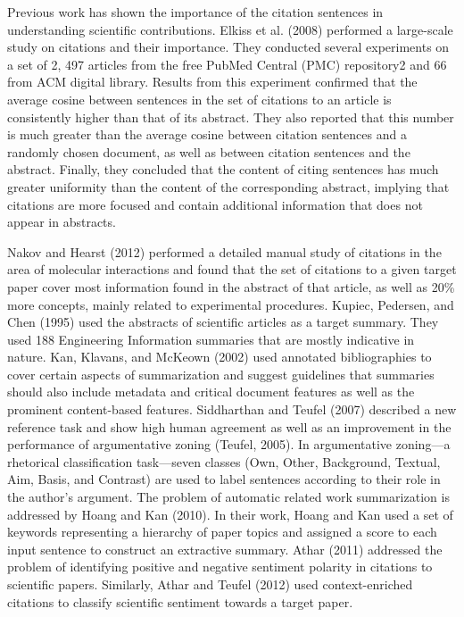 Previous work has shown the importance of the citation sentences in understanding
scientific contributions. Elkiss et al. (2008) performed a large-scale study on citations and
their importance. They conducted several experiments on a set of 2, 497 articles from the
free PubMed Central (PMC) repository2 and 66 from ACM digital library. Results from this
experiment confirmed that the average cosine between sentences in the set of citations to an
article is consistently higher than that of its abstract. They also reported that this number
is much greater than the average cosine between citation sentences and a randomly chosen
document, as well as between citation sentences and the abstract. Finally, they concluded
that the content of citing sentences has much greater uniformity than the content of the
corresponding abstract, implying that citations are more focused and contain additional
information that does not appear in abstracts.

Nakov and Hearst (2012) performed a detailed manual study of citations in the area
of molecular interactions and found that the set of citations to a given target paper cover
most information found in the abstract of that article, as well as 20\% more concepts, mainly
related to experimental procedures.
Kupiec, Pedersen, and Chen (1995) used the abstracts of scientific articles as a target
summary. They used 188 Engineering Information summaries that are mostly indicative
in nature. Kan, Klavans, and McKeown (2002) used annotated bibliographies to cover
certain aspects of summarization and suggest guidelines that summaries should also include
metadata and critical document features as well as the prominent content-based features.
Siddharthan and Teufel (2007) described a new reference task and show high human
agreement as well as an improvement in the performance of argumentative zoning (Teufel,
2005). In argumentative zoning—a rhetorical classification task—seven classes (Own, Other,
Background, Textual, Aim, Basis, and Contrast) are used to label sentences according to
their role in the author’s argument.
The problem of automatic related work summarization is addressed by Hoang and Kan
(2010). In their work, Hoang and Kan used a set of keywords representing a hierarchy of
paper topics and assigned a score to each input sentence to construct an extractive summary.
Athar (2011) addressed the problem of identifying positive and negative sentiment polarity
in citations to scientific papers. Similarly, Athar and Teufel (2012) used context-enriched
citations to classify scientific sentiment towards a target paper.